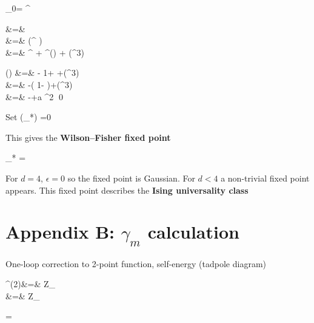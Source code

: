 \documentclass[12pt]{report}
\begin{document}
\beq
\lam_0=
\mu^\eps \lam
{}
\eeq

&=&\mu{}
\\
&=&
\mu{}
\left(\mu^\eps
{}\right)
\\
&=&
\eps\mu^\eps
{}
+
\mu^\eps \beta(\lam)
+
\calo(\lam^3)
\eeqa

\beqa
\beta(\lam)
&=&
-\eps\lam
{}
{1+} +\calo(\lam^3)
\\
&=&
-\eps\lam\left(
1- 
\right)+\calo(\lam^3)
\\
&=& -\eps\lam +a \lam^2
\eeqa
\qed


Set
\beq
\beta(\lambda_*) =0
\eeq

This gives the {\bf Wilson–Fisher fixed point}

\beq
\lambda_* =
 \eps
\eeq

For $d=4$, 
$
\epsilon=0
$
so the fixed point is Gaussian.
For $d<4$ a non-trivial fixed point appears.
This fixed point describes the {\bf Ising universality class}

\section{Appendix B: $\gamma_m$ calculation}




 One-loop correction to 
2-point function, self-energy (tadpole diagram)

\beqa
\Gamma^{(2)}&=&
Z_\phi
{}
\\
&=&
Z_\phi {}
\eeqa

\beq
\bcen
{}
\ecen
\quad
\calt = 
\int {}\;
\eeq
\end{document}
